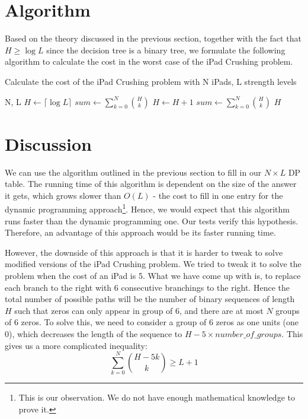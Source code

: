 \documentclass[12pt,a4paper,oneside]{report}
\begin{document}
\section{Algorithm}
Based on the theory discussed in the previous section, together with the fact that $H \geq \log L$ since the decision tree is a binary tree, we formulate the following algorithm to calculate the cost in the worst case of the iPad Crushing problem.

\begin{algorithm}
        \caption{Calculate the cost of the iPad Crushing problem with N iPads, L strength levels}
        \begin{algorithmic}[1]
            \REQUIRE N, L
	\STATE $H \leftarrow \lceil \log L\rceil$
	\STATE $sum \leftarrow \sum_{k=0}^{N} {H \choose k}$
		\STATE $H \leftarrow H+1$
		\STATE $sum \leftarrow \sum_{k=0}^{N} {H \choose k}$
	\ENDWHILE
	\RETURN $H$
        \end{algorithmic}
\end{algorithm}

\section{Discussion}
We can use the algorithm outlined in the previous section to fill in our $N \times L$ DP table. The running time of this algorithm is dependent on the size of the answer it gets, which grows slower than $O(L)$ - the cost to fill in one entry for the dynamic programming approach\footnote{This is our observation. We do not have enough mathematical knowledge to prove it.}. Hence, we would expect that this algorithm runs faster than the dynamic programming one. Our tests verify this hypothesis. Therefore, an advantage of this approach would be its faster running time.

However, the downside of this approach is that it is harder to tweak to solve modified versions of the iPad Crushing problem. We tried to tweak it to solve the problem when the cost of an iPad is 5. What we have come up with is, to replace each branch to the right with 6 consecutive branchings to the right. Hence the total number of possible paths will be the number of binary sequences of length $H$ such that zeros can only appear in group of 6, and there are at most $N$ groups of 6 zeros. To solve this, we need to consider a group of 6 zeros as one units (one 0), which decreases the length of the sequence to $H - 5 \times number\_of\_groups$. This gives us a more complicated inequality: \[\sum_{k=0}^{N} {H-5k \choose k} \geq L+1\]
\end{document}
